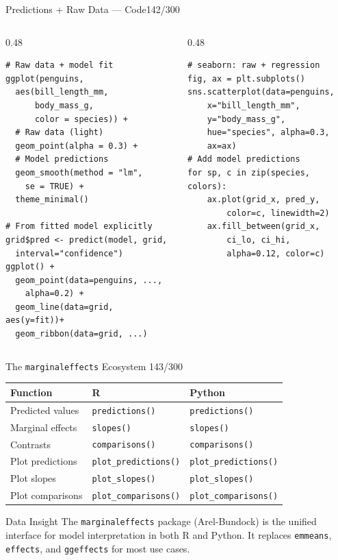 \documentclass[10pt]{beamer}
\newcommand{\smark}[1]{\hfill{\scriptsize\color{codegray}#1}}
\begin{document}
\begin{frame}[fragile]{Predictions + Raw Data --- Code}\smark{142/300}
\begin{columns}[T]
\begin{column}{0.48\textwidth}
\begin{lstlisting}[style=Rstyle]
# Raw data + model fit
ggplot(penguins,
  aes(bill_length_mm,
      body_mass_g,
      color = species)) +
  # Raw data (light)
  geom_point(alpha = 0.3) +
  # Model predictions
  geom_smooth(method = "lm",
    se = TRUE) +
  theme_minimal()

# From fitted model explicitly
grid$pred <- predict(model, grid,
  interval="confidence")
ggplot() +
  geom_point(data=penguins, ...,
    alpha=0.2) +
  geom_line(data=grid, aes(y=fit))+
  geom_ribbon(data=grid, ...)
\end{lstlisting}
\end{column}
\begin{column}{0.48\textwidth}
\begin{lstlisting}[style=Pystyle]
# seaborn: raw + regression
fig, ax = plt.subplots()
sns.scatterplot(data=penguins,
    x="bill_length_mm",
    y="body_mass_g",
    hue="species", alpha=0.3,
    ax=ax)
# Add model predictions
for sp, c in zip(species, colors):
    ax.plot(grid_x, pred_y,
        color=c, linewidth=2)
    ax.fill_between(grid_x,
        ci_lo, ci_hi,
        alpha=0.12, color=c)
\end{lstlisting}
\end{column}
\end{columns}
\end{frame}

\begin{frame}{The \texttt{marginaleffects} Ecosystem}
\smark{143/300}
\centering\small
\begin{tabular}{@{}lll@{}}
    \toprule
    \textbf{Function} & \textbf{R} & \textbf{Python} \\
    \midrule
    Predicted values    & \texttt{predictions()}     & \texttt{predictions()} \\
    Marginal effects    & \texttt{slopes()}          & \texttt{slopes()} \\
    Contrasts           & \texttt{comparisons()}     & \texttt{comparisons()} \\
    Plot predictions    & \texttt{plot\_predictions()} & \texttt{plot\_predictions()} \\
    Plot slopes         & \texttt{plot\_slopes()}      & \texttt{plot\_slopes()} \\
    Plot comparisons    & \texttt{plot\_comparisons()} & \texttt{plot\_comparisons()} \\
    \bottomrule
\end{tabular}

\vspace{0.3cm}
\begin{exampleblock}{Data Insight}
    \scriptsize The \texttt{marginaleffects} package (Arel-Bundock) is the unified interface for model interpretation in both R and Python. It replaces \texttt{emmeans}, \texttt{effects}, and \texttt{ggeffects} for most use cases.
\end{exampleblock}
\end{frame}
\end{document}
